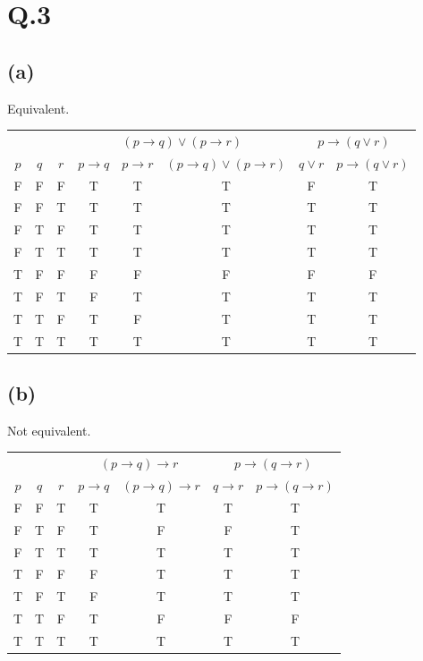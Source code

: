 \documentclass[a4paper,12pt]{article}
\begin{document}
\section*{Q.3}

\subsection*{(a)}
Equivalent.
\begin{center}
	\begin{tabular}{cccccccc}
		\toprule
		& & & \multicolumn{3}{c}{$(p \to q) \vee  (p \to r)$} & \multicolumn{2}{c}{$p \to (q \vee r)$}\\
		\cmidrule(lr){4-6} \cmidrule(lr){7-8}
		$p$ & $q$ & $r$ & $p \to q$ & $p \to r$ & $(p \to q) \vee  (p \to r)$ & $q \vee r$ & $p \to (q \vee r)$ \\
		\midrule
		F & F & F & T & T & T & F & T \\
		F & F & T & T & T & T & T & T \\
		F & T & F & T & T & T & T & T \\
		F & T & T & T & T & T & T & T \\
		T & F & F & F & F & F & F & F \\
		T & F & T & F & T & T & T & T \\
		T & T & F & T & F & T & T & T \\
		T & T & T & T & T & T & T & T \\
		\bottomrule
	\end{tabular}
\end{center}

\subsection*{(b)}
Not equivalent.
\begin{center}
	\begin{tabular}{ccccccc}
		\toprule
		& & & \multicolumn{2}{c}{$(p \to q)\to r$} & \multicolumn{2}{c}{$p \to (q \to r)$}\\
		\cmidrule(lr){4-5} \cmidrule(lr){6-7}
		$p$ & $q$ & $r$ & $p \to q$ & $(p \to q)\to r$ & $q \to r$ & $p \to (q \to r)$ \\
		\midrule
		F & F & T & T & T & T & T \\
		F & T & F & T & F & F & T \\
		F & T & T & T & T & T & T \\
		T & F & F & F & T & T & T \\
		T & F & T & F & T & T & T \\
		T & T & F & T & F & F & F \\
		T & T & T & T & T & T & T \\
		\bottomrule
	\end{tabular}
\end{center}
\end{document}
